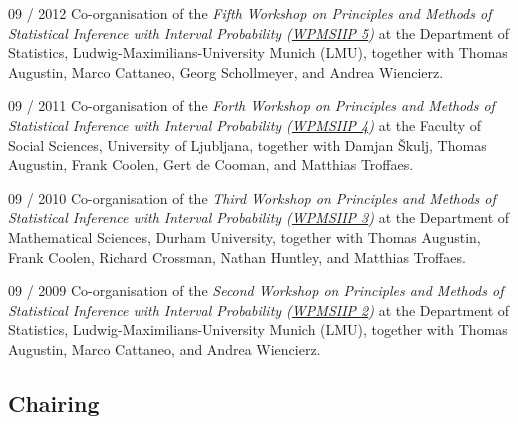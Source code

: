 \documentclass[a4paper]{simplecv}
\begin{document}
\begin{topic}
\item[09 / 2012] Co-organisation of the \emph{Fifth Workshop on Principles and Methods of Statistical Inference with Interval Probability (\href{http://www.statistik.lmu.de/institut/ag/statsoz_neu/research/WPMSIIP_2012/}{WPMSIIP 5})}
                 at the Department of Statistics, Ludwig-Maximilians-University Munich (LMU),
                 together with Thomas Augustin, Marco Cattaneo, Georg Schollmeyer, and Andrea Wiencierz.
                 
\item[09 / 2011] Co-organisation of the \emph{Forth Workshop on Principles and Methods of Statistical Inference with Interval Probability (\href{http://wpmsiip2011.fdvinfo.net/c/646/Information/}{WPMSIIP 4})}
                 at the Faculty of Social Sciences, University of Ljubljana,
                 together with Damjan \v{S}kulj, Thomas Augustin, Frank Coolen, Gert de Cooman, and Matthias Troffaes.

\item[09 / 2010] Co-organisation of the \emph{Third Workshop on Principles and Methods of Statistical Inference with Interval Probability (\href{http://www.maths.dur.ac.uk/users/matthias.troffaes/wpmsiip2010/}{WPMSIIP 3})}
                 at the Department of Mathematical Sciences, Durham University,
                 together with Thomas Augustin, Frank Coolen, Richard Crossman, Nathan Huntley, and Matthias Troffaes.

\item[09 / 2009] Co-organisation of the \emph{Second Workshop on Principles and Methods of Statistical Inference with Interval Probability (\href{http://www.stat.uni-muenchen.de/~walter/workshop0909/}{WPMSIIP 2})}
                 at the Department of Statistics, Ludwig-Maximilians-University Munich (LMU),
                 together with Thomas Augustin, Marco Cattaneo, and Andrea Wiencierz.
\end{topic}

\subsection{Chairing}
\end{document}
